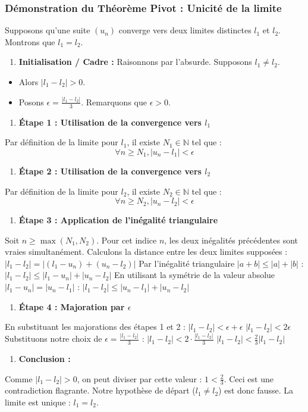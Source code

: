 \documentclass[a4paper,11pt]{report}
\begin{document}
\subsubsection*{Démonstration du Théorème Pivot : Unicité de la limite}
Supposons qu'une suite $(u_n)$ converge vers deux limites distinctes $l_1$ et $l_2$. Montrons que $l_1 = l_2$.
\begin{enumerate}
\item \textbf{Initialisation / Cadre :} Raisonnons par l'absurde. Supposons $l_1 \neq l_2$.
\end{enumerate}
\begin{itemize}
\item Alors $|l_1 - l_2| > 0$.

\item Posons $\epsilon = \frac{|l_1 - l_2|}{3}$. Remarquons que $\epsilon > 0$.
\end{itemize}
\begin{enumerate}
\item \textbf{Étape 1 : Utilisation de la convergence vers $l_1$}
\end{enumerate}
   Par définition de la limite pour $l_1$, il existe $N_1 \in \mathbb{N}$ tel que :
   $$\forall n \ge N_1, |u_n - l_1| < \epsilon$$
\begin{enumerate}
\item \textbf{Étape 2 : Utilisation de la convergence vers $l_2$}
\end{enumerate}
   Par définition de la limite pour $l_2$, il existe $N_2 \in \mathbb{N}$ tel que :
   $$\forall n \ge N_2, |u_n - l_2| < \epsilon$$
\begin{enumerate}
\item \textbf{Étape 3 : Application de l'inégalité triangulaire}
\end{enumerate}
   Soit $n \ge \max(N_1, N_2)$. Pour cet indice $n$, les deux inégalités précédentes sont vraies simultanément.
   Calculons la distance entre les deux limites supposées :
   $|l_1 - l_2| = |(l_1 - u_n) + (u_n - l_2)|$
   Par l'inégalité triangulaire $|a+b| \le |a| + |b|$ :
   $|l_1 - l_2| \le |l_1 - u_n| + |u_n - l_2|$
   En utilisant la symétrie de la valeur absolue $|l_1 - u_n| = |u_n - l_1|$ :
   $|l_1 - l_2| \le |u_n - l_1| + |u_n - l_2|$
\begin{enumerate}
\item \textbf{Étape 4 : Majoration par $\epsilon$}
\end{enumerate}
   En substituant les majorations des étapes 1 et 2 :
   $|l_1 - l_2| < \epsilon + \epsilon$
   $|l_1 - l_2| < 2\epsilon$
   Substituons notre choix de $\epsilon = \frac{|l_1 - l_2|}{3}$ :
   $|l_1 - l_2| < 2 \cdot \frac{|l_1 - l_2|}{3}$
   $|l_1 - l_2| < \frac{2}{3} |l_1 - l_2|$
\begin{enumerate}
\item \textbf{Conclusion :}
\end{enumerate}
   Comme $|l_1 - l_2| > 0$, on peut diviser par cette valeur :
   $1 < \frac{2}{3}$.
   Ceci est une contradiction flagrante. Notre hypothèse de départ ($l_1 \neq l_2$) est donc fausse.
   La limite est unique : $l_1 = l_2$.
\end{document}
